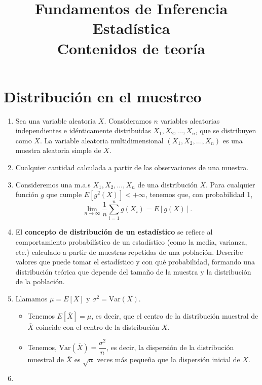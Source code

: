 
\title{Fundamentos de Inferencia Estadística\\Contenidos de teoría}


\maketitle
\section{Distribución en el muestreo}
\begin{enumerate}[label=\color{red}\textbf{\arabic*)}]
  \item {} 

    Sea una variable aleatoria $X$. Consideramos $n$ variables aleatorias independientes e idénticamente distribuidas \linebreak $X_1,X_2,\dots,X_n$, que se distribuyen como $X$. La variable aleatoria multidimensional  $(X_1,X_2,\dots,X_n)$ es una muestra aleatoria simple de $X$.

  \item  {} 

    Cualquier cantidad calculada a partir de las observaciones de una muestra.

  \item {} 

    Consideremos una m.a.s $X_1,X_2,\dots,X_n$ de una distribución $X$. Para cualquier función  $g$ que cumple  $E[g^2(X)]<+\infty$, tenemos que, con probabilidad 1, \[
      \lim_{n \to \infty} \dfrac{1}{n}\sum_{i=1}^{n} g(X_i)=E[g(X)].
    \] 
  \item {}

    El \textbf{concepto de distribución de un estadístico} se refiere al comportamiento probabilístico de un estadístico (como la media, varianza, etc.) calculado a partir de muestras repetidas de una población. Describe valores que puede tomar el estadístico y con qué probabilidad, formando una distribución teórica que depende del tamaño de la muestra y la distribución de la población.

  \item {}

    Llamamos $\mu=E[X]$ y $\sigma^2=\mathrm{Var}(X)$.
    \begin{itemize}[label=\textbullet]
      \item Tenemos $E[\overline{X}]=\mu$, es decir, que el centro de la distribución muestral de $\overline{X}$ coincide con el centro de la distribución $X$.
      \item Tenemos,  $\mathrm{Var}(\overline{X})=\dfrac{\sigma^2}{n}$, es decir, la dispersión de la distribución muestral de $\overline{X}$ es $\sqrt{n} $ veces más pequeña que la dispersión inicial de $X$.
    \end{itemize}
  \item {}


\end{enumerate}
